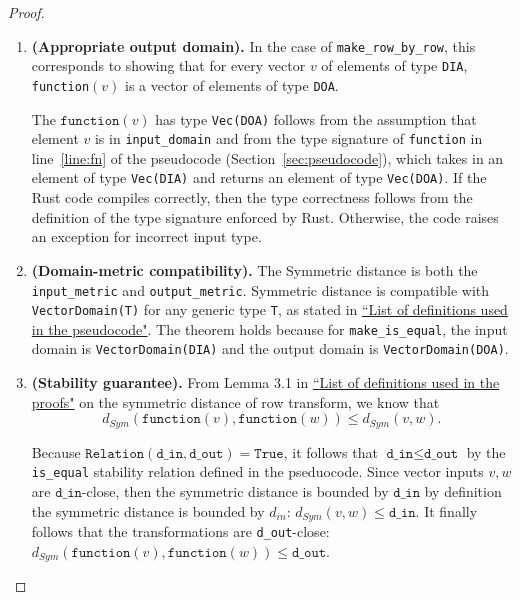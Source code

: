 \documentclass[11pt,a4paper]{article}
\newcommand{\grace}[1]{{ {\color{purple}{(grace)~#1}}}}
\newcommand{\din}{\texttt{d\_in}}
\newcommand{\dout}{\texttt{d\_out}}
\newcommand{\Relation}{\texttt{Relation}}
\newcommand{\function}{\texttt{function}}
\begin{document}
\begin{proof}
\begin{enumerate}
\item \textbf{(Appropriate output domain).} In the case of \texttt{make\_row\_by\_row}, this corresponds to showing that for every vector $v$ of elements of type \texttt{DIA}, \texttt{function}$(v)$ is a vector of elements of type \texttt{DOA}. 

The $\function(v)$ has type \texttt{Vec(DOA)} follows from the assumption that element $v$ is in \texttt{input\_domain} and from the type signature of \texttt{function} in line~\ref{line:fn} of the pseudocode (Section~\ref{sec:pseudocode}), which takes in an element of type \texttt{Vec(DIA)} and returns an element of type \texttt{Vec(DOA)}. If the Rust code compiles correctly, then the type correctness follows from the definition of the type signature enforced by Rust. Otherwise, the code raises an exception for incorrect input type. 


\grace{I think checking type signature is sufficient for this pf.}

\item \textbf{(Domain-metric compatibility).} The Symmetric distance is both the \texttt{input\_metric} and \texttt{output\_metric}. Symmetric distance is compatible with \texttt{VectorDomain(T)} for any generic type \texttt{T}, as stated in \href{https://www.overleaf.com/project/60d215bf90b337ac02200a99}{``List of definitions used in the pseudocode"}. The theorem holds because for \texttt{make\_is\_equal}, the input domain is \texttt{VectorDomain(DIA)} and the output domain is \texttt{VectorDomain(DOA)}. 


\item \textbf{(Stability guarantee).} From Lemma 3.1 in \href{https://www.overleaf.com/project/60d214e390b337703d200982}{``List of definitions used in the proofs"} on the symmetric distance of row transform, we know that $$d_{Sym}(\texttt{function}(v), \texttt{function}(w)) \leq d_{Sym}(v, w).$$

Because $\Relation(\din, \dout) = \texttt{True}$, it follows that $\din \leq \dout$ by the \texttt{is\_equal} stability relation defined in the pseduocode. Since vector inputs $v, w$ are $\din$-close, then the symmetric distance is bounded by $\din$ by definition the symmetric distance is bounded by $d_{in}$: $d_{Sym}(v, w) \leq \din$. It finally follows that the transformations are \dout-close: $d_{Sym}(\function(v), \function(w)) \leq \dout$.
\end{enumerate}
\end{proof}
\end{document}
